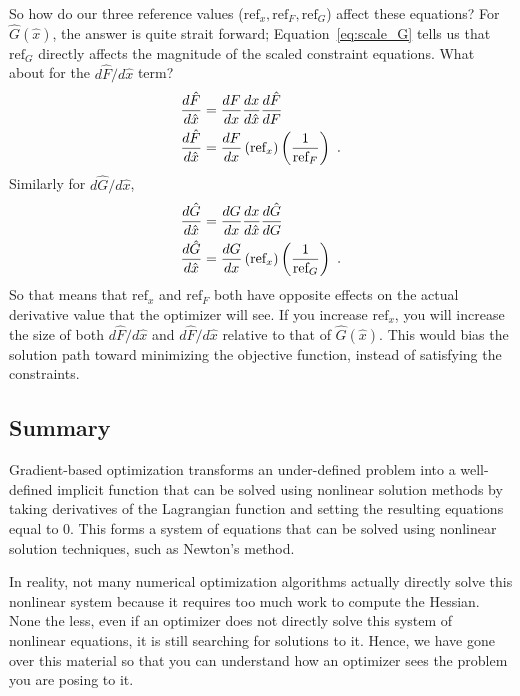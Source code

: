 \documentclass[conf]{new-aiaa}
\begin{document}
    So how do our three reference values ($\text{ref}_x, \text{ref}_F, \text{ref}_G$) affect these equations? 
    For $\hat{G}(\hat{x})$, the answer is quite strait forward; 
    Equation~\eqref{eq:scale_G} tells us that $\text{ref}_G$ directly affects the magnitude of the scaled constraint equations. 
    What about for the $d \hat{F}/d\hat{x}$ term? 
    \begin{align}
        \frac{d\hat{F}}{d\hat{x}} &= \frac{dF}{dx} \frac{dx}{d\hat{x}} \frac{d\hat{F}}{dF} \notag \\
        \frac{d\hat{F}}{d\hat{x}} &= \frac{dF}{dx} \left(\text{ref}_x \right) \left(\frac{1}{\text{ref}_F}\right) \ .
    \end{align}
    Similarly for $d \hat{G}/d\hat{x}$, 
    \begin{align}
        \frac{d\hat{G}}{d\hat{x}} &= \frac{dG}{dx} \frac{dx}{d\hat{x}} \frac{d\hat{G}}{dG} \notag \\
        \frac{d\hat{G}}{d\hat{x}} &= \frac{dG}{dx} \left(\text{ref}_x \right) \left(\frac{1}{\text{ref}_G}\right) \ .
    \end{align}
    So that means that $\text{ref}_x$ and $\text{ref}_F$ both have opposite effects on the actual derivative value that the optimizer will see. 
    If you increase $\text{ref}_x$, you will increase the size of both $d\hat{F}/d\hat{x}$ and $d\hat{F}/d\hat{x}$ relative to that of $\hat{G}(\hat{x})$. 
    This would bias the solution path toward minimizing the objective function, instead of satisfying the constraints. 
    



    \subsection{Summary}
    Gradient-based optimization transforms an under-defined problem into a well-defined implicit function that can be solved using nonlinear solution methods by taking derivatives of the Lagrangian function and setting the resulting equations equal to 0. 
    This forms a system of equations that can be solved using nonlinear solution techniques, such as Newton's method. 

    In reality, not many numerical optimization algorithms actually directly solve this nonlinear system because it requires too much work to compute the Hessian. 
    None the less, even if an optimizer does not directly solve this system of nonlinear equations, it is still searching for solutions to it. 
    Hence, we have gone over this material so that you can understand how an optimizer sees the problem you are posing to it. 
\end{document}
